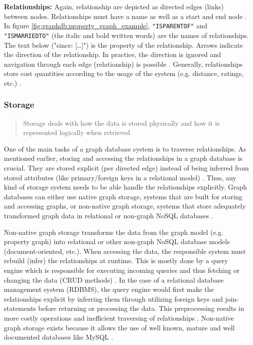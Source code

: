 \textbf{Relationships:} Again, relationship are depicted as directed edges (links) between nodes. Relationships must have a name as well as a start and end node \autocite{graphdb2015} . In figure \ref{fig:graphdb:property_graph_example}, \texttt{"IS\textunderscore PARENT\textunderscore OF"} and \texttt{"IS\textunderscore MARRIED\textunderscore TO"} (the italic and bold written words) are the names of relationships. The text below ("since: […]") is the property of the relationship. Arrows indicate the direction of the relationship.  In practice, the direction is ignored and navigation through each edge (relationship) is possible \autocite{maheshlal2015, neo4j:graphdb}. Generally, relationships store cost quantities according to the usage of the system (e.g. distance, ratings, etc.) \autocite{neo4j:graphdb}.

\subsubsection{Storage}
\blockquote{Storage deals with how the data is stored physically and how it is represented logically when retrieved}\autocite{maheshlal2015}

One of the main tasks of a graph database system is to traverse relationships. As mentioned earlier, storing and accessing the relationships in a graph database is crucial. They are stored explicit (per directed edge) instead of being inferred from stored attributes (like primary/foreign keys in a relational model) \autocite{maheshlal2015} . Thus, any kind of storage system needs to be able handle the relationships explicitly. Graph databases can either use native graph storage, systems that are built for storing and accessing graphs, or non-native graph storage, systems that store adequately transformed graph data in relational or non-graph NoSQL databases \autocite{graphdb2015}.


Non-native graph storage transforms the data from the graph model (e.g. property graph) into relational or other non-graph NoSQL database models (document-oriented, etc.). When accessing the data, the responsible system must rebuild (infer) the relationships at runtime. This is mostly done by a query engine which is responsible for executing incoming queries and thus fetching or changing the data (CRUD methods) \autocite{maheshlal2015} . In the case of a relational database management system (RDBMS), the query engine would first make the relationships explicit by inferring them through utilizing foreign keys and join-statements before returning or processing the data. This preprocessing results in more costly operations and inefficient traversing of relationships \autocite{maheshlal2015}. Non-native graph storage exists because it allows the use of well known, mature and well documented databases like MySQL \autocite{graphdb2015}.

